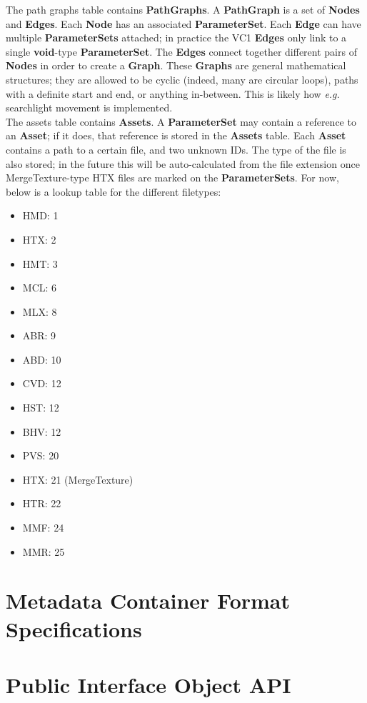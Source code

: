 \documentclass{article}
\begin{document}
The path graphs table contains \textbf{PathGraphs}. A \textbf{PathGraph} is a set of \textbf{Nodes} and \textbf{Edges}. Each \textbf{Node} has an associated \textbf{ParameterSet}. Each \textbf{Edge} can have multiple \textbf{ParameterSets} attached; in practice the VC1 \textbf{Edges} only link to a single \textbf{void}-type \textbf{ParameterSet}. The \textbf{Edges} connect together different pairs of \textbf{Nodes} in order to create a \textbf{Graph}. These \textbf{Graphs} are general mathematical structures; they are allowed to be cyclic (indeed, many are circular loops), paths with a definite start and end, or anything in-between. This is likely how \textit{e.g.} searchlight movement is implemented.\\

The assets table contains \textbf{Assets}. A \textbf{ParameterSet} may contain a reference to an \textbf{Asset}; if it does, that reference is stored in the \textbf{Assets} table. Each \textbf{Asset} contains a path to a certain file, and two unknown IDs. The type of the file is also stored; in the future this will be auto-calculated from the file extension once MergeTexture-type HTX files are marked on the \textbf{ParameterSets}. For now, below is a lookup table for the different filetypes:
\begin{itemize}
\item HMD: 1
\item HTX: 2
\item HMT: 3
\item MCL: 6
\item MLX: 8
\item ABR: 9
\item ABD: 10
\item CVD: 12
\item HST: 12
\item BHV: 12
\item PVS: 20
\item HTX: 21 (MergeTexture)
\item HTR: 22
\item MMF: 24
\item MMR: 25
\end{itemize}

\newpage
\section{Metadata Container Format Specifications}

\newpage
\section{Public Interface Object API}
\end{document}
